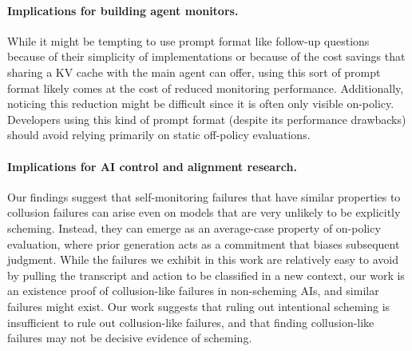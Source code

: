 \paragraph{Implications for building agent monitors.} %
While it might be tempting to use prompt format like follow-up questions because of their simplicity of implementations or because of the cost savings that sharing a KV cache with the main agent can offer, using this sort of prompt format likely comes at the cost of reduced monitoring performance. Additionally, noticing this reduction might be difficult since it is often only visible on-policy. Developers using this kind of prompt format (despite its performance drawbacks) should avoid relying primarily on static off-policy evaluations.

\paragraph{Implications for AI control and alignment research.} Our findings suggest that self-monitoring failures that have similar properties to collusion failures can arise even on models that are very unlikely to be explicitly scheming. Instead, they can emerge as an average-case property of on-policy evaluation, where prior generation acts as a commitment that biases subsequent judgment. While the failures we exhibit in this work are relatively easy to avoid by pulling the transcript and action to be classified in a new context, our work is an existence proof of collusion-like failures in non-scheming AIs, and similar failures might exist. Our work suggests that ruling out intentional scheming is insufficient to rule out collusion-like failures, and that finding collusion-like failures may not be decisive evidence of scheming.

